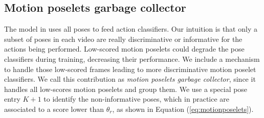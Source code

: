 \subsection{Motion poselets garbage collector}
\label{subsec:garbage_collector}
The model in \cite{Lillo2014} uses all poses to feed action classifiers. Our 
intuition is that only a subset of poses in each video are really discriminative 
or informative for the actions being performed. Low-scored motion poselets 
could  degrade the pose classifiers during training, decreasing their 
performance. 
We include a mechanism to handle those low-scored 
frames leading to more discriminative motion poselet classifiers. 
We call this contribution as \emph{motion poselets garbage collector}, since it 
handles all low-scores motion poselets and group them. We use a special pose 
entry $K+1$ to identify the non-informative poses, which in practice are 
associated to a score lower than $\theta_r$, as shown in Equation 
(\ref{eq:motionposelets}).





 






